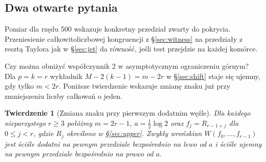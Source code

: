 \documentclass[11pt,a4paper,reqno]{amsart}
\newtheorem{theorem}{Twierdzenie}[section]
\numberwithin{equation}{section}
\begin{document}
\subsection{Dwa otwarte pytania}

Pomiar dla rzędu 500 wskazuje konkretny przedział zwarty do pokrycia. Przeniesienie całkowitoliczbowej kongruencji z \S\ref{sec:witness} na przedziały z resztą Taylora jak w \S\ref{sec:jet} da równość, jeśli test przejdzie na każdej komórce.

Czy można obniżyć współczynnik \(2\) w asymptotycznym ograniczeniu górnym? Dla \(p=k=r\) wykładnik \(M-2(k-1)=m-2r\) w \S\ref{sec:shift} staje się ujemny, gdy tylko \(m<2r\). Poniższe twierdzenie wskazuje zmianę znaku już przy zmniejszeniu liczby całkowań o jeden.

\begin{theorem}[Zmiana znaku przy pierwszym dodatnim węźle]\label{th:firstknot}
Dla każdego nieparzystego \(r\ge3\) połóżmy \(m=2r-1\), \(a=\tfrac12\log2\) oraz \(f_j=R_{r-1+j}\) dla \(0\le j<r\), gdzie \(R_j\) określono w \S\ref{sec:upper}. Zwykły wrońskian \(W(f_0,\ldots,f_{r-1})\) jest ściśle dodatni na pewnym przedziale bezpośrednio na lewo od \(a\) i ściśle ujemny na pewnym przedziale bezpośrednio na prawo od \(a\).
\end{theorem}
\end{document}
